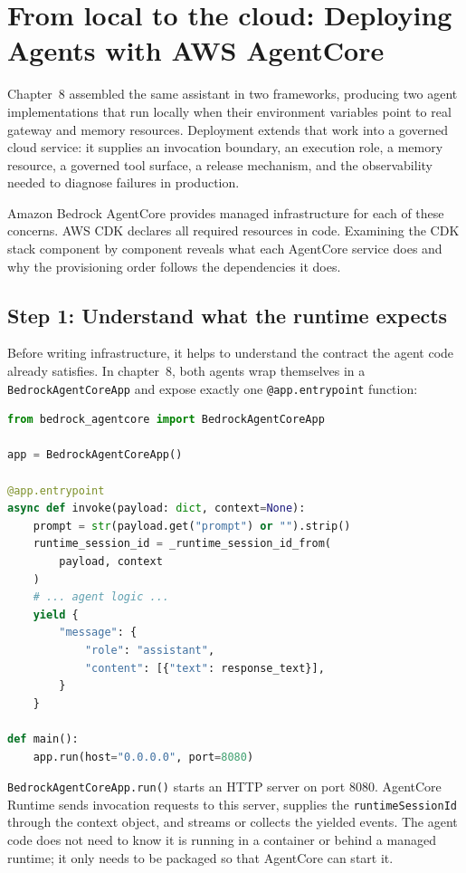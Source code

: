 \chapter{From local to the cloud: Deploying Agents with AWS AgentCore}

Chapter~8 assembled the same assistant in two frameworks, producing two agent
implementations that run locally when their environment variables point to real gateway
and memory resources. Deployment extends that work into a governed cloud service: it
supplies an invocation boundary, an execution role, a memory resource, a governed tool
surface, a release mechanism, and the observability needed to diagnose failures in
production.

Amazon Bedrock AgentCore provides managed infrastructure for each of these concerns. AWS
CDK declares all required resources in code. Examining the CDK stack component by
component reveals what each AgentCore service does and why the provisioning order follows
the dependencies it does.

\section{Step 1: Understand what the runtime expects}

Before writing infrastructure, it helps to understand the contract the agent code already
satisfies. In chapter~8, both agents wrap themselves in a \texttt{BedrockAgentCoreApp}
and expose exactly one \texttt{@app.entrypoint} function:

\begin{lstlisting}[language=Python]
from bedrock_agentcore import BedrockAgentCoreApp

app = BedrockAgentCoreApp()

@app.entrypoint
async def invoke(payload: dict, context=None):
    prompt = str(payload.get("prompt") or "").strip()
    runtime_session_id = _runtime_session_id_from(
        payload, context
    )
    # ... agent logic ...
    yield {
        "message": {
            "role": "assistant",
            "content": [{"text": response_text}],
        }
    }

def main():
    app.run(host="0.0.0.0", port=8080)
\end{lstlisting}

\texttt{BedrockAgentCoreApp.run()} starts an HTTP server on port 8080. AgentCore Runtime
sends invocation requests to this server, supplies the \texttt{runtimeSessionId} through
the context object, and streams or collects the yielded events. The agent code does not
need to know it is running in a container or behind a managed runtime; it only needs to
be packaged so that AgentCore can start it.

